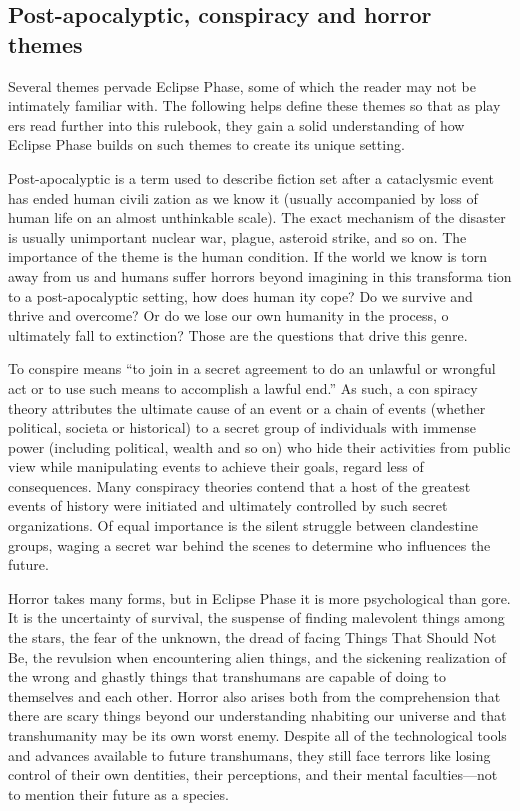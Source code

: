\subsection{Post-apocalyptic, conspiracy and horror themes} \label{sec:post-apoc-consp} 

Several themes pervade Eclipse Phase, some of which the reader may not be intimately familiar with. The following helps define these themes so that as play ers read further into this rulebook, they gain a solid understanding of how Eclipse Phase builds on such themes to create its unique setting. 

Post-apocalyptic is a term used to describe fiction set after a cataclysmic event has ended human civili zation as we know it (usually accompanied by loss of human life on an almost unthinkable scale). The exact mechanism of the disaster is usually unimportant nuclear war, plague, asteroid strike, and so on. The importance of the theme is the human condition. If the world we know is torn away from us and humans suffer horrors beyond imagining in this transforma tion to a post-apocalyptic setting, how does human ity cope? Do we survive and thrive and overcome? Or do we lose our own humanity in the process, o ultimately fall to extinction? Those are the questions that drive this genre. 

To conspire means ``to join in a secret agreement to do an unlawful or wrongful act or to use such means to accomplish a lawful end.'' As such, a con spiracy theory attributes the ultimate cause of an event or a chain of events (whether political, societa or historical) to a secret group of individuals with immense power (including political, wealth and so on) who hide their activities from public view while manipulating events to achieve their goals, regard less of consequences. Many conspiracy theories contend that a host of the greatest events of history were initiated and ultimately controlled by such secret organizations. Of equal importance is the silent struggle between clandestine groups, waging a secret war behind the scenes to determine who influences the future. 

Horror takes many forms, but in Eclipse Phase it is more psychological than gore. It is the uncertainty of survival, the suspense of finding malevolent things among the stars, the fear of the unknown, the dread of facing Things That Should Not Be, the revulsion when encountering alien things, and the sickening realization of the wrong and ghastly things that transhumans are capable of doing to themselves and each other. Horror also arises both from the comprehension that there are scary things beyond our understanding nhabiting our universe and that transhumanity may be its own worst enemy. Despite all of the technological tools and advances available to future transhumans, they still face terrors like losing control of their own dentities, their perceptions, and their mental faculties—not to mention their future as a species. 

